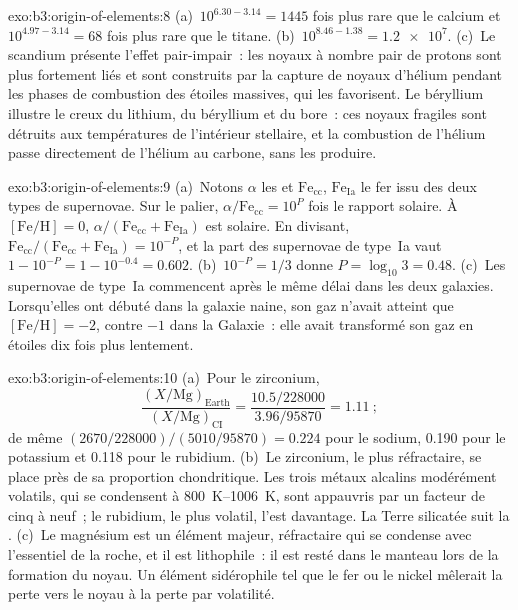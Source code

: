 \begin{solution}{exo:b3:origin-of-elements:8}
(a)~$10^{6.30 - 3.14} = 1445$ fois plus rare que le calcium et
$10^{4.97 - 3.14} = 68$ fois plus rare que le titane. (b)~$10^{8.46 - 1.38}
= \num{1.2e7}$. (c)~Le scandium présente l'effet pair-impair~: les noyaux
à nombre pair de protons sont plus fortement liés et sont construits par la
capture de noyaux d'hélium pendant les phases de combustion des étoiles massives,
qui les favorisent. Le béryllium illustre le creux du lithium, du béryllium et du bore~:
ces noyaux fragiles sont détruits aux températures de l'intérieur stellaire,
et la combustion de l'hélium passe directement de l'hélium au carbone,
sans les produire.
\end{solution}

\begin{solution}{exo:b3:origin-of-elements:9}
(a)~Notons $\alpha$ les  et $\mathrm{Fe}_\mathrm{cc}$,
$\mathrm{Fe}_\mathrm{Ia}$ le fer issu des deux types de supernovae. Sur
le palier, $\alpha/\mathrm{Fe}_\mathrm{cc} = 10^{P}$ fois le rapport
solaire. À $[\mathrm{Fe/H}] = 0$, $\alpha/(\mathrm{Fe}_\mathrm{cc} +
\mathrm{Fe}_\mathrm{Ia})$ est solaire. En divisant,
$\mathrm{Fe}_\mathrm{cc}/(\mathrm{Fe}_\mathrm{cc} + \mathrm{Fe}_\mathrm{Ia})
= 10^{-P}$, et la part des supernovae de type~Ia vaut $1 - 10^{-P} = 1 - 10^{-0.4} =
\num{0.602}$. (b)~$10^{-P} = 1/3$ donne $P = \log_{10}3 = 0.48$.
(c)~Les supernovae de type~Ia commencent après le même délai dans les deux
galaxies. Lorsqu'elles ont débuté dans la galaxie naine, son gaz n'avait
atteint que $[\mathrm{Fe/H}] = -2$, contre $-1$ dans la Galaxie~: elle avait
transformé son gaz en étoiles dix fois plus lentement.
\end{solution}

\begin{solution}{exo:b3:origin-of-elements:10}
(a)~Pour le zirconium,
\[
\frac{(X/\mathrm{Mg})_\mathrm{Earth}}{(X/\mathrm{Mg})_\mathrm{CI}} =
\frac{10.5/228000}{3.96/95870} = 1.11~;
\]
de même $(2670/228000)/(5010/95870) = 0.224$ pour le sodium,
\num{0.190} pour le potassium et \num{0.118} pour le rubidium. (b)~Le zirconium, le plus réfractaire, se place
près de sa proportion chondritique. Les trois métaux alcalins
modérément volatils, qui se condensent à \qtyrange{800}{1006}{K}, sont appauvris par
un facteur de cinq à neuf~; le rubidium, le plus volatil, l'est davantage. La
Terre silicatée suit la . (c)~Le magnésium est un élément majeur,
réfractaire qui se condense avec l'essentiel de la roche, et il est
lithophile~: il est resté dans le manteau lors de la formation du noyau. Un élément sidérophile
tel que le fer ou le nickel mêlerait la perte vers le noyau à la
perte par volatilité.
\end{solution}

